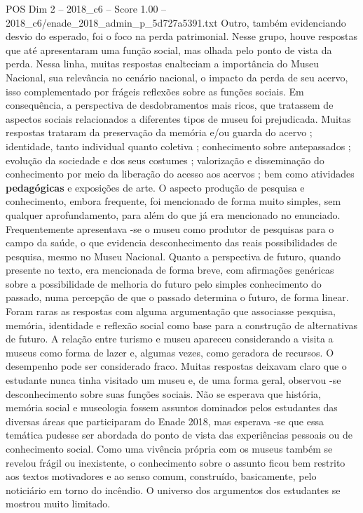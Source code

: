 \begin{textsample}{POS Dim 2 – 2018\_c6 – Score 1.00 – 2018\_c6/enade\_2018\_admin\_p\_5d727a5391.txt}
Outro, também evidenciando desvio do esperado, foi o foco na perda patrimonial.
Nesse grupo, houve respostas que até apresentaram uma função social, mas olhada pelo ponto de vista da perda.
Nessa linha, muitas respostas enalteciam a importância do Museu Nacional, sua relevância no cenário nacional, o impacto da perda de seu acervo, isso complementado por frágeis reflexões sobre as funções sociais.
Em consequência, a perspectiva de desdobramentos mais ricos, que tratassem de aspectos sociais relacionados a diferentes tipos de museu foi prejudicada.
Muitas respostas trataram da preservação da memória e/ou guarda do acervo ; identidade, tanto individual quanto coletiva ; conhecimento sobre antepassados ; evolução da sociedade e dos seus costumes ; valorização e disseminação do conhecimento por meio da liberação do acesso aos acervos ; bem como atividades \textbf{pedagógicas} e exposições de arte.
O aspecto produção de pesquisa e conhecimento, embora frequente, foi mencionado de forma muito simples, sem qualquer aprofundamento, para além do que já era mencionado no enunciado.
Frequentemente apresentava -se o museu como produtor de pesquisas para o campo da saúde, o que evidencia desconhecimento das reais possibilidades de pesquisa, mesmo no Museu Nacional.
Quanto a perspectiva de futuro, quando presente no texto, era mencionada de forma breve, com afirmações genéricas sobre a possibilidade de melhoria do futuro pelo simples conhecimento do passado, numa percepção de que o passado determina o futuro, de forma linear.
Foram raras as respostas com alguma argumentação que associasse pesquisa, memória, identidade e reflexão social como base para a construção de alternativas de futuro.
A relação entre turismo e museu apareceu considerando a visita a museus como forma de lazer e, algumas vezes, como geradora de recursos.
O desempenho pode ser considerado fraco.
Muitas respostas deixavam claro que o estudante nunca tinha visitado um museu e, de uma forma geral, observou -se desconhecimento sobre suas funções sociais.
Não se esperava que história, memória social e museologia fossem assuntos dominados pelos estudantes das diversas áreas que participaram do Enade 2018, mas esperava -se que essa temática pudesse ser abordada do ponto de vista das experiências pessoais ou de conhecimento social.
Como uma vivência própria com os museus também se revelou frágil ou inexistente, o conhecimento sobre o assunto ficou bem restrito aos textos motivadores e ao senso comum, construído, basicamente, pelo noticiário em torno do incêndio.
O universo dos argumentos dos estudantes se mostrou muito limitado.

\end{textsample}
